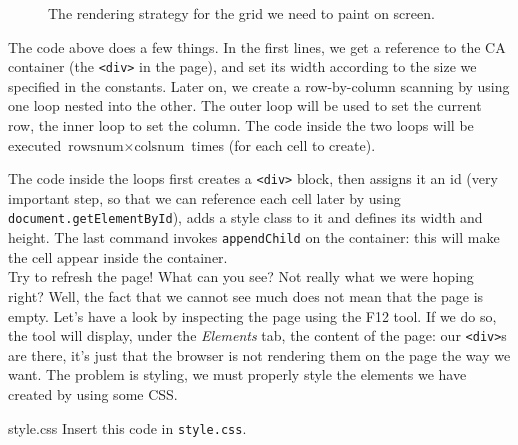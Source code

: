 %
\begin{figure}[b]
\sidecaption

%
%
\caption{The rendering strategy for the grid we need to paint on screen.}
\label{fig:gridlayout}
\end{figure}
%

The code above does a few things. In the first lines, we get a reference to the CA container
(the \texttt{<div>} in the page), and set its width according to the size we specified in the
constants. Later on, we create a row-by-column scanning by using one loop nested into the other.
The outer loop will be used to set the current row, the inner loop to set the column. The code
inside the two loops will be executed $\text{rowsnum} \times \text{colsnum}$ times
(for each cell to create).

The code inside the loops first creates a \texttt{<div>} block, then assigns it an id (very
important step, so that we can reference each cell later
by using \texttt{document.getElementById}), adds a style class to it and defines its width and height.
The last command invokes \texttt{appendChild} on the container: this will make the cell appear
inside the container.\\

Try to refresh the page! What can you see? Not really what we were hoping right? Well, the fact that
we cannot see much does not mean that the page is empty. Let's have a look by inspecting the page
using the F12 tool. If we do so, the tool will display, under the \textit{Elements} tab, the
content of the page: our \texttt{<div>}s are there, it's just that the browser is not rendering
them on the page the way we want. The problem is styling, we must properly style the elements we
have created by using some CSS.

\begin{programcode}{style.css}
Insert this code in \texttt{style.css}.
\end{programcode}

